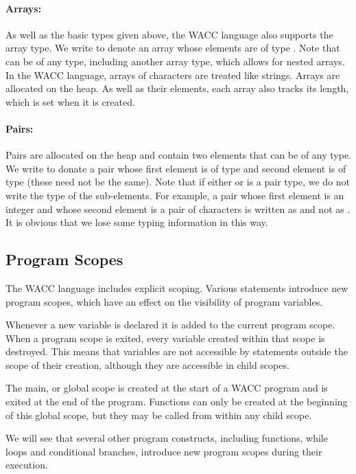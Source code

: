 \documentclass[a4paper]{article}
\theoremstyle{definition}
\begin{document}
\paragraph{Arrays:}
As well as the basic types given above, the WACC language also supports the array type.
We write  to denote an array whose elements are of type .
Note that  can be of any type, including another array type, which allows for nested arrays.
In the WACC language, arrays of characters are treated like strings.
Arrays are allocated on the heap.
As well as their elements, each array also tracks its length, which is set when it is created.

\paragraph{Pairs:}
Pairs are allocated on the heap and contain two elements that can be of any type.
We write  to donate a pair whose first element is of type  and second element is of type 
(these need not be the same).
Note that if either  or  is a pair type, we do not write the type of the sub-elements.
For example, a pair whose first element is an integer
and whose second element is a pair of characters is written as  and not as .
It is obvious that we lose some typing information in this way.

\subsection{Program Scopes}
The WACC language includes explicit scoping.
Various statements introduce new program scopes, which have an effect on the visibility of program variables.

Whenever a new variable is declared it is added to the current program scope.
When a program scope is exited, every variable created within that scope is destroyed.
This means that variables are not accessible by statements outside the scope of their creation,
although they are accessible in child scopes.

The main, or global scope is created at the start of a WACC program and is exited at the end of the program.
Functions can only be created at the beginning of this global scope, but they may be called from within any child scope.

We will see that several other program constructs, including functions, while loops and conditional branches,
introduce new program scopes during their execution.
\end{document}
